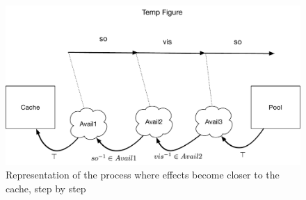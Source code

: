 \begin{figure}
	\centering
	\includegraphics[scale = 0.4]{Figures/Availability_deg.pdf}
\caption{Representation of the process where effects become closer to
the cache, step by step}
\end{figure}
